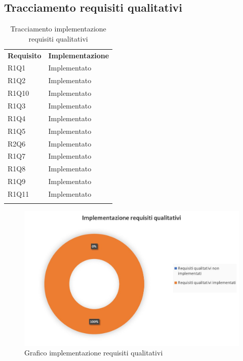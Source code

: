    \subsection{Tracciamento requisiti qualitativi}
        \begin{longtable} {
            >{\centering}p{64.5mm} 
            >{}p{64.5mm}
            }
        \rowcolor{gray!50}
            \textbf{Requisito} & \textbf{Implementazione} \TBstrut \\
            R1Q1 & Implementato \TBstrut \\ [2mm]
            R1Q2 & Implementato \TBstrut \\ [2mm]
            R1Q10 & Implementato \TBstrut \\ [2mm]
            R1Q3 & Implementato \TBstrut \\ [2mm]
            R1Q4 & Implementato \TBstrut \\ [2mm]
            R1Q5 & Implementato \TBstrut \\ [2mm]
            R2Q6 & Implementato \TBstrut \\ [2mm]
            R1Q7 & Implementato \TBstrut \\ [2mm]
            R1Q8 & Implementato \TBstrut \\ [2mm]
            R1Q9 & Implementato \TBstrut \\ [2mm]
            R1Q11 & Implementato \TBstrut \\ [2mm]
            \rowcolor{white}
            \caption{Tracciamento implementazione requisiti qualitativi}
        \end{longtable}
        \begin{figure}[H]
            \includegraphics[width=\textwidth,height=\textheight,keepaspectratio]{./img/Grafici/implementazione_requisiti_qualitativi.jpg}
            \caption{Grafico implementazione requisiti qualitativi}
        \end{figure}

